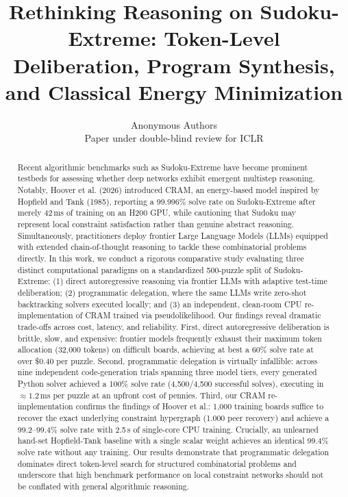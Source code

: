 \documentclass{article} %
\title{Rethinking Reasoning on Sudoku-Extreme: Token-Level Deliberation, Program Synthesis, and Classical Energy Minimization}
\author{Anonymous Authors\\
Paper under double-blind review for ICLR\\
}
\begin{document}
\maketitle

\begin{abstract}
Recent algorithmic benchmarks such as Sudoku-Extreme have become prominent testbeds for assessing whether deep networks exhibit emergent multistep reasoning. Notably, Hoover et al. (2026) introduced CRAM, an energy-based model inspired by Hopfield and Tank (1985), reporting a 99.996\% solve rate on Sudoku-Extreme after merely 42\,ms of training on an H200 GPU, while cautioning that Sudoku may represent local constraint satisfaction rather than genuine abstract reasoning. Simultaneously, practitioners deploy frontier Large Language Models (LLMs) equipped with extended chain-of-thought reasoning to tackle these combinatorial problems directly. In this work, we conduct a rigorous comparative study evaluating three distinct computational paradigms on a standardized 500-puzzle split of Sudoku-Extreme: (1) direct autoregressive reasoning via frontier LLMs with adaptive test-time deliberation; (2) programmatic delegation, where the same LLMs write zero-shot backtracking solvers executed locally; and (3) an independent, clean-room CPU re-implementation of CRAM trained via pseudolikelihood. Our findings reveal dramatic trade-offs across cost, latency, and reliability. First, direct autoregressive deliberation is brittle, slow, and expensive: frontier models frequently exhaust their maximum token allocation (32,000 tokens) on difficult boards, achieving at best a 60\% solve rate at over \$0.40 per puzzle. Second, programmatic delegation is virtually infallible: across nine independent code-generation trials spanning three model tiers, every generated Python solver achieved a 100\% solve rate (4,500/4,500 successful solves), executing in $\approx 1.2$\,ms per puzzle at an upfront cost of pennies. Third, our CRAM re-implementation confirms the findings of Hoover et al.: 1,000 training boards suffice to recover the exact underlying constraint hypergraph (1.000 peer recovery) and achieve a 99.2--99.4\% solve rate with 2.5\,s of single-core CPU training. Crucially, an unlearned hand-set Hopfield-Tank baseline with a single scalar weight achieves an identical 99.4\% solve rate without any training. Our results demonstrate that programmatic delegation dominates direct token-level search for structured combinatorial problems and underscore that high benchmark performance on local constraint networks should not be conflated with general algorithmic reasoning.
\end{abstract}
\end{document}
